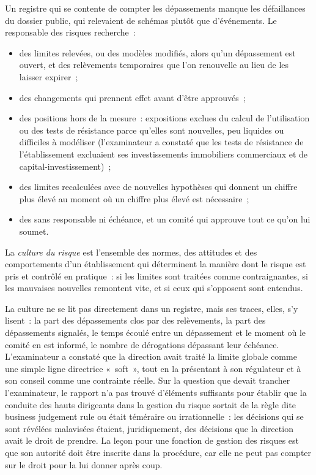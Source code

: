 Un registre qui se contente de compter les dépassements manque les défaillances du dossier public, qui relevaient de schémas plutôt que d'événements. Le responsable des risques recherche~:
\begin{itemize}
\item des limites relevées, ou des modèles modifiés, alors qu'un dépassement est ouvert, et des relèvements temporaires que l'on renouvelle au lieu de les laisser expirer~;
\item des changements qui prennent effet avant d'être approuvés~;
\item des positions hors de la mesure~: expositions exclues du calcul de l'utilisation ou des tests de résistance parce qu'elles sont nouvelles, peu liquides ou
difficiles à modéliser (l'examinateur a constaté que les tests de résistance de l'établissement excluaient ses investissements immobiliers commerciaux et de capital-investissement)~;
\item des limites recalculées avec de nouvelles hypothèses qui donnent un chiffre plus élevé au moment où un chiffre plus élevé est nécessaire~;
\item des  sans responsable ni échéance, et un comité qui approuve tout ce qu'on lui soumet.
\end{itemize}

\begin{definition}\label{def:fm:the-risk-management-function:culture}
La \emph{culture du risque} est l'ensemble des normes, des attitudes et des comportements d'un établissement qui déterminent la manière dont le risque est pris et contrôlé en
pratique~: si les limites sont traitées comme contraignantes, si les mauvaises nouvelles remontent vite, et si ceux qui s'opposent sont entendus.
\end{definition}

La culture ne se lit pas directement dans un registre, mais ses traces, elles, s'y lisent~: la part des dépassements clos par des relèvements, la part des dépassements signalés, le temps
écoulé entre un dépassement et le moment où le comité en est informé, le nombre de dérogations dépassant leur échéance. L'examinateur a constaté que la direction avait traité la
limite globale comme une simple ligne directrice «~soft~», tout en la présentant à son régulateur et à son conseil comme une contrainte réelle. Sur la question
que devait trancher l'examinateur, le rapport n'a pas trouvé d'éléments suffisants pour établir que la conduite des hauts dirigeants dans la gestion du risque sortait de la règle dite business judgement rule ou
était téméraire ou irrationnelle~: les décisions qui se sont révélées malavisées étaient, juridiquement, des décisions que la direction avait le droit de prendre. La leçon pour une fonction de gestion des risques
est que son autorité doit être inscrite dans la procédure, car elle ne peut pas compter sur le droit pour la lui donner après coup.

